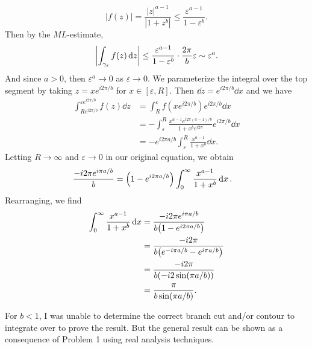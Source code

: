 \documentclass[12pt]{article}
\theoremstyle{definition}
\newcommand{\eps}{\varepsilon}
\begin{document}
\[
    |f(z)|
        = \frac{|z|^{a-1}}{|1 + z^b|}
        \leq \frac{\eps^{a-1}}{1 - \eps^b}.
\]
Then by the $ML$-estimate,
\[
    \qty|\int_{\gamma_\eps} f(z) \dd{z}|
        \leq \frac{\eps^{a-1}}{1 - \eps^b} \cdot \frac{2\pi}{b} \eps
        \sim \eps^a.
\]
And since $a > 0$, then $\eps^a \to 0$ as $\eps \to 0$. We parameterize the integral over the top segment by taking $z = x e^{i2\pi/b}$ for $x \in [\eps, R]$. Then $\dd{z} = e^{i2\pi/b} \dd{x}$ and we have
\begin{align*}
    \int_{Re^{i2\pi/b}}^{\eps e^{i2\pi/b}} f(z) \dd{z}
        &= \int_{R}^{\eps} f(xe^{i2\pi/b}) e^{i2\pi/b} \dd{x} \\
        &= - \int_{\eps}^{R} \frac{x^{a-1}e^{i2\pi(a-1)/b}}{1 + x^be^{i2\pi}} e^{i2\pi/b}\dd{x} \\
        &= - e^{i2\pi a/b} \int_{\eps}^{R} \frac{x^{a-1}}{1 + x^b} \dd{x}.
\end{align*}
Letting $R \to \infty$ and $\eps \to 0$ in our original equation, we obtain
\begin{align*}
    \frac{-i2\pi e^{i\pi a/b}}{b}
        &= \qty(1 - e^{i2\pi a/b}) \int_{0}^{\infty} \frac{x^{a-1}}{1 + x^b} \dd{x}.
\end{align*}
Rearranging, we find
\begin{align*}
    \int_{0}^{\infty} \frac{x^{a-1}}{1 + x^b} \dd{x}
        &= \frac{-i2\pi e^{i\pi a/b}}{b\qty(1 - e^{i2\pi a/b})} \\
        &= \frac{-i2\pi}{b\qty(e^{-i\pi a/b} - e^{i\pi a/b})} \\
        &= \frac{-i2\pi}{b(-i2\sin(\pi a/b))} \\
        &= \frac{\pi}{b\sin(\pi a/b)}.
\end{align*}



\newpage

For $b < 1$, I was unable to determine the correct branch cut and/or contour to integrate over to prove the result. But the general result can be shown as a consequence of Problem 1 using real analysis techniques.
\end{document}

